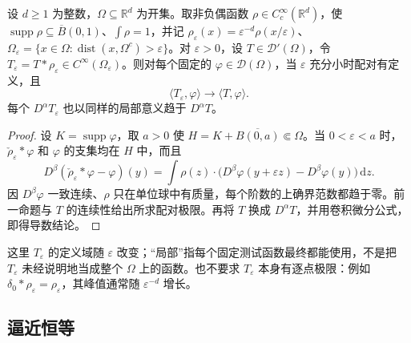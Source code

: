 \begin{theorem}[分布的局部光滑化]\label{b1:thm:distribution-regularization}
设 \(d\geq1\) 为整数，\(\Omega\subseteq\mathbb R^d\) 为开集。取非负偶函数 \(\rho\in C_c^\infty(\mathbb R^d)\)，使 \(\operatorname{supp}\rho\subseteq\overline B(0,1)\)、\(\int\rho=1\)，并记 \(\rho_\varepsilon(x)=\varepsilon^{-d}\rho(x/\varepsilon)\)、\(\Omega_\varepsilon=\{x\in\Omega:\operatorname{dist}(x,\Omega^c)>\varepsilon\}\)。对 \(\varepsilon>0\)，设 \(T\in\mathcal D'(\Omega)\)，令 \(T_\varepsilon=T*\rho_\varepsilon\in C^\infty(\Omega_\varepsilon)\)。则对每个固定的 \(\varphi\in\mathcal D(\Omega)\)，当 \(\varepsilon\) 充分小时配对有定义，且
\[
 \langle T_\varepsilon,\varphi\rangle\longrightarrow\langle T,\varphi\rangle.
\]
每个 \(D^\alpha T_\varepsilon\) 也以同样的局部意义趋于 \(D^\alpha T\)。
\end{theorem}
\begin{proof}
设 \(K=\operatorname{supp}\varphi\)，取 \(a>0\) 使 \(H=K+\overline{B(0,a)}\Subset\Omega\)。当 \(0<\varepsilon<a\) 时，\(\check\rho_\varepsilon*\varphi\) 和 \(\varphi\) 的支集均在 \(H\) 中，而且
\[
 D^\beta(\check\rho_\varepsilon*\varphi-\varphi)(y)
 =\int\rho(z)\cdot\bigl(D^\beta\varphi(y+\varepsilon z)-D^\beta\varphi(y)\bigr)\,\mathrm dz.
\]
因 \(D^\beta\varphi\) 一致连续、\(\rho\) 只在单位球中有质量，每个阶数的上确界范数都趋于零。前一命题与 \(T\) 的连续性给出所求配对极限。再将 \(T\) 换成 \(D^\alpha T\)，并用卷积微分公式，即得导数结论。
\end{proof}

这里 \(T_\varepsilon\) 的定义域随 \(\varepsilon\) 改变；“局部”指每个固定测试函数最终都能使用，不是把 \(T_\varepsilon\) 未经说明地当成整个 \(\Omega\) 上的函数。也不要求 \(T_\varepsilon\) 本身有逐点极限：例如 \(\delta_0*\rho_\varepsilon=\rho_\varepsilon\)，其峰值通常随 \(\varepsilon^{-d}\) 增长。

\subsection{逼近恒等}
\label{b1:subsec:200304}

